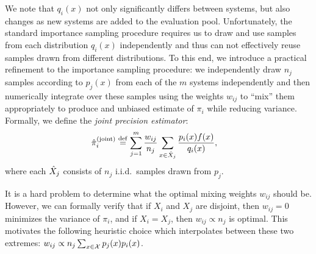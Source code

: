 We note that $q_i(x)$ not only significantly differs between systems, but also changes as new systems are added to the evaluation pool.
Unfortunately, the standard importance sampling procedure requires us to draw and use samples from each distribution $q_i(x)$ independently and thus can not effectively reuse samples drawn from different distributions.
To this end, we introduce a practical refinement to the importance sampling procedure:
we independently draw $n_j$ samples according to $p_j(x)$ from each of the $m$ systems independently 
and then numerically integrate over these samples using the weights $w_{ij}$ to ``mix'' them appropriately to produce and unbiased estimate of $\pi_i$ while reducing variance.
Formally, we define the \emph{joint precision estimator}:
\begin{align*}
  {\hat{\pi}}_i^{\text{(joint)}} &\stackrel{\rm def}{=} \sum_{j=1}^m \frac{w_{ij}}{n_{j}} \sum_{x \in {\hat{X}}_j} \frac{p_i(x) f(x)}{q_i(x)},
\end{align*}
where each ${\hat{X}}_j$ consists of $n_j$ i.i.d.~samples drawn from $p_j$.

It is a hard problem to determine what the optimal mixing weights $w_{ij}$ should be.
However, we can formally verify that 
  if $X_i$ and $X_j$ are disjoint, then $w_{ij} = 0$ minimizes the variance of $\pi_i$,
  and if $X_i = X_j$, then $w_{ij} \propto n_{j}$ is optimal.
This motivates the following heuristic choice which interpolates between these two extremes:
$w_{ij} \propto n_{j} \sum_{x \in \mathcal{X}} p_j(x) p_i(x)$.

